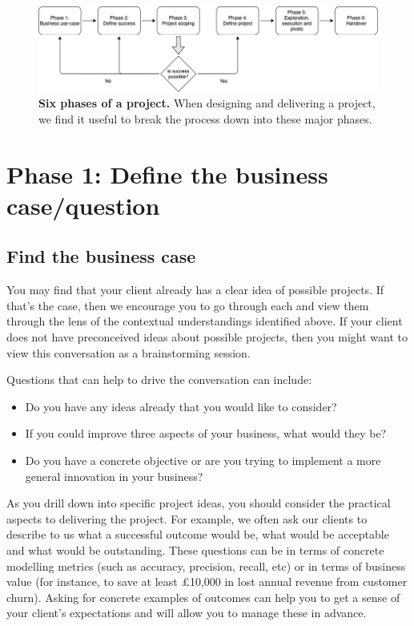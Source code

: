 \documentclass[
]{book}
\providecommand{\tightlist}{%
  \setlength{\itemsep}{0pt}\setlength{\parskip}{0pt}}
\begin{document}
\begin{figure}
\includegraphics[width=1\linewidth]{figures/Figure_2-phases} \caption{\textbf{Six phases of a project.} When designing and delivering a project, we find it useful to break the process down into these major phases.}\label{fig:bottom-fig}
\end{figure}



\hypertarget{phase-1-define-the-business-casequestion}{%
\section{Phase 1: Define the business case/question}\label{phase-1-define-the-business-casequestion}}

\hypertarget{find-the-business-case}{%
\subsection{Find the business case}\label{find-the-business-case}}

You may find that your client already has a clear idea of possible projects. If that's the case, then we encourage you to go through each and view them through the lens of the contextual understandings identified above. If your client does not have preconceived ideas about possible projects, then you might want to view this conversation as a brainstorming session.

Questions that can help to drive the conversation can include:

\begin{itemize}
\tightlist
\item
  Do you have any ideas already that you would like to consider?
\item
  If you could improve three aspects of your business, what would they be?
\item
  Do you have a concrete objective or are you trying to implement a more general innovation in your business?
\end{itemize}

As you drill down into specific project ideas, you should consider the practical aspects to delivering the project. For example, we often ask our clients to describe to us what a successful outcome would be, what would be acceptable and what would be outstanding. These questions can be in terms of concrete modelling metrics (such as accuracy, precision, recall, etc) or in terms of business value (for instance, to save at least £10,000 in lost annual revenue from customer churn). Asking for concrete examples of outcomes can help you to get a sense of your client's expectations and will allow you to manage these in advance.
\end{document}
